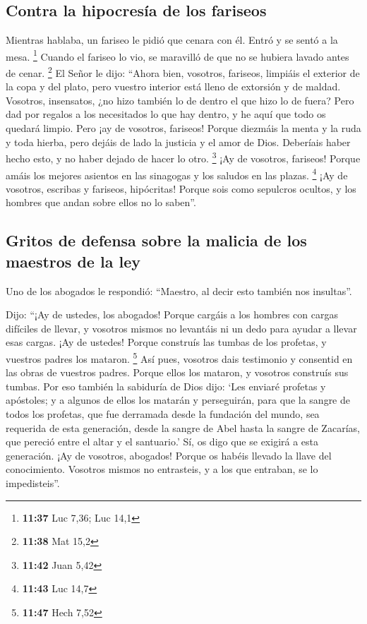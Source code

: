 \begin{paracol}{2}
\hypertarget{contra-la-hipocresuxeda-de-los-fariseos}{%
\subsection{Contra la hipocresía de los
fariseos}\label{contra-la-hipocresuxeda-de-los-fariseos}}

 Mientras hablaba, un fariseo le pidió que cenara con él.
Entró y se sentó a la mesa. \footnote{\textbf{11:37} Luc 7,36; Luc 14,1}
 Cuando el fariseo lo vio, se maravilló de que no se
hubiera lavado antes de cenar. \footnote{\textbf{11:38} Mat 15,2}
 El Señor le dijo: ``Ahora bien, vosotros, fariseos,
limpiáis el exterior de la copa y del plato, pero vuestro interior está
lleno de extorsión y de maldad.  Vosotros, insensatos,
¿no hizo también lo de dentro el que hizo lo de fuera? 
Pero dad por regalos a los necesitados lo que hay dentro, y he aquí que
todo os quedará limpio.  Pero ¡ay de vosotros, fariseos!
Porque diezmáis la menta y la ruda y toda hierba, pero dejáis de lado la
justicia y el amor de Dios. Deberíais haber hecho esto, y no haber
dejado de hacer lo otro. \footnote{\textbf{11:42} Juan 5,42}
 ¡Ay de vosotros, fariseos! Porque amáis los mejores
asientos en las sinagogas y los saludos en las plazas. \footnote{\textbf{11:43}
  Luc 14,7}  ¡Ay de vosotros, escribas y fariseos,
hipócritas! Porque sois como sepulcros ocultos, y los hombres que andan
sobre ellos no lo saben''.

\hypertarget{gritos-de-defensa-sobre-la-malicia-de-los-maestros-de-la-ley}{%
\subsection{Gritos de defensa sobre la malicia de los maestros de la
ley}\label{gritos-de-defensa-sobre-la-malicia-de-los-maestros-de-la-ley}}

 Uno de los abogados le respondió: ``Maestro, al decir
esto también nos insultas''.

 Dijo: ``¡Ay de ustedes, los abogados! Porque cargáis a
los hombres con cargas difíciles de llevar, y vosotros mismos no
levantáis ni un dedo para ayudar a llevar esas cargas. 
¡Ay de ustedes! Porque construís las tumbas de los profetas, y vuestros
padres los mataron. \footnote{\textbf{11:47} Hech 7,52} 
Así pues, vosotros dais testimonio y consentid en las obras de vuestros
padres. Porque ellos los mataron, y vosotros construís sus tumbas.
 Por eso también la sabiduría de Dios dijo: `Les enviaré
profetas y apóstoles; y a algunos de ellos los matarán y perseguirán,
 para que la sangre de todos los profetas, que fue
derramada desde la fundación del mundo, sea requerida de esta
generación,  desde la sangre de Abel hasta la sangre de
Zacarías, que pereció entre el altar y el santuario.' Sí, os digo que se
exigirá a esta generación.  ¡Ay de vosotros, abogados!
Porque os habéis llevado la llave del conocimiento. Vosotros mismos no
entrasteis, y a los que entraban, se lo impedisteis''.


\end{paracol}
